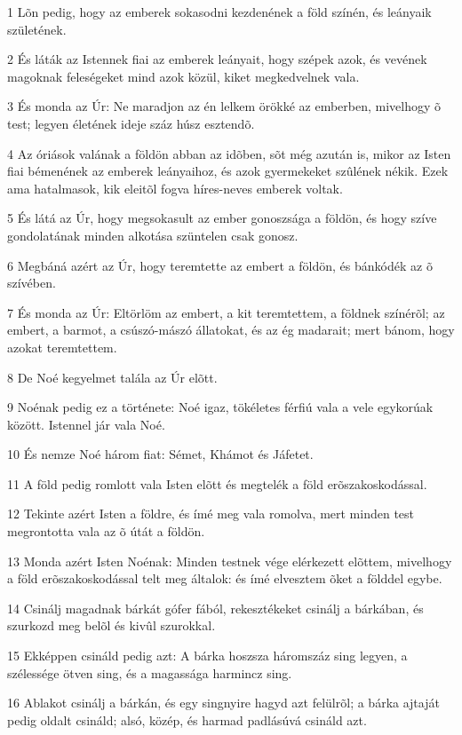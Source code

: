 \par 1 Lõn pedig, hogy az emberek sokasodni kezdenének a föld színén, és leányaik születének.
\par 2 És láták az Istennek fiai az emberek leányait, hogy szépek azok, és vevének magoknak feleségeket mind azok közül, kiket megkedvelnek vala.
\par 3 És monda az Úr: Ne maradjon az én lelkem örökké az emberben, mivelhogy õ test; legyen életének ideje száz húsz esztendõ.
\par 4 Az óriások valának a földön abban az idõben, sõt még azután is, mikor az Isten fiai bémenének az emberek leányaihoz, és azok gyermekeket szûlének nékik. Ezek ama hatalmasok, kik eleitõl fogva híres-neves emberek voltak.
\par 5 És látá az Úr, hogy megsokasult az ember gonoszsága a földön, és hogy szíve gondolatának minden alkotása szüntelen csak gonosz.
\par 6 Megbáná azért az Úr, hogy teremtette az embert a földön, és bánkódék az õ szívében.
\par 7 És monda az Úr: Eltörlöm az embert, a kit teremtettem, a földnek színérõl; az embert, a barmot, a csúszó-mászó állatokat, és az ég madarait; mert bánom, hogy azokat teremtettem.
\par 8 De Noé kegyelmet talála az Úr elõtt.
\par 9 Noénak pedig ez a története: Noé igaz, tökéletes férfiú vala a vele egykorúak között. Istennel jár vala Noé.
\par 10 És nemze Noé három fiat: Sémet, Khámot és Jáfetet.
\par 11 A föld pedig romlott vala Isten elõtt és megtelék a föld erõszakoskodással.
\par 12 Tekinte azért Isten a földre, és ímé meg vala romolva, mert minden test megrontotta vala az õ útát a földön.
\par 13 Monda azért Isten Noénak: Minden testnek vége elérkezett elõttem, mivelhogy a föld erõszakoskodással telt meg általok: és ímé elvesztem õket a földdel egybe.
\par 14 Csinálj magadnak bárkát gófer fából, rekesztékeket csinálj a bárkában, és szurkozd meg belõl és kivûl szurokkal.
\par 15 Ekképpen csináld pedig azt: A bárka hoszsza háromszáz sing legyen, a szélessége ötven sing, és a magassága harmincz sing.
\par 16 Ablakot csinálj a bárkán, és egy singnyire hagyd azt felülrõl; a bárka ajtaját pedig oldalt csináld; alsó, közép, és harmad padlásúvá csináld azt.
